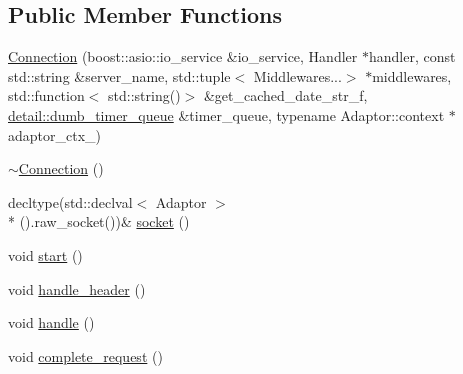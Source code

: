 \subsection*{Public Member Functions}
\begin{DoxyCompactItemize}
\item 
\hyperlink{classcrow_1_1_connection_af4571bb4cd73f9c4874f615e9c08fd2d}{Connection} (boost\-::asio\-::io\-\_\-service \&io\-\_\-service, Handler $\ast$handler, const std\-::string \&server\-\_\-name, std\-::tuple$<$ Middlewares...$>$ $\ast$middlewares, std\-::function$<$ std\-::string()$>$ \&get\-\_\-cached\-\_\-date\-\_\-str\-\_\-f, \hyperlink{classcrow_1_1detail_1_1dumb__timer__queue}{detail\-::dumb\-\_\-timer\-\_\-queue} \&timer\-\_\-queue, typename Adaptor\-::context $\ast$adaptor\-\_\-ctx\-\_\-)
\item 
\hyperlink{classcrow_1_1_connection_a4800edf5f2600ecdefd7d792d237b945}{$\sim$\-Connection} ()
\item 
decltype(std\-::declval$<$ Adaptor $>$\\*
().raw\-\_\-socket())\& \hyperlink{classcrow_1_1_connection_adb5878dd700c30dae10f3fa8d06ecbab}{socket} ()
\item 
void \hyperlink{classcrow_1_1_connection_a00e6802466a18fd967ce065522844e2f}{start} ()
\item 
void \hyperlink{classcrow_1_1_connection_adde7a01b5ad446b0f7b1fb6fa6d3c23b}{handle\-\_\-header} ()
\item 
void \hyperlink{classcrow_1_1_connection_ac347b6e80cfbc071579781062c78e667}{handle} ()
\item 
void \hyperlink{classcrow_1_1_connection_aa40019a3731cc55174401e3b31602524}{complete\-\_\-request} ()
\end{DoxyCompactItemize}


